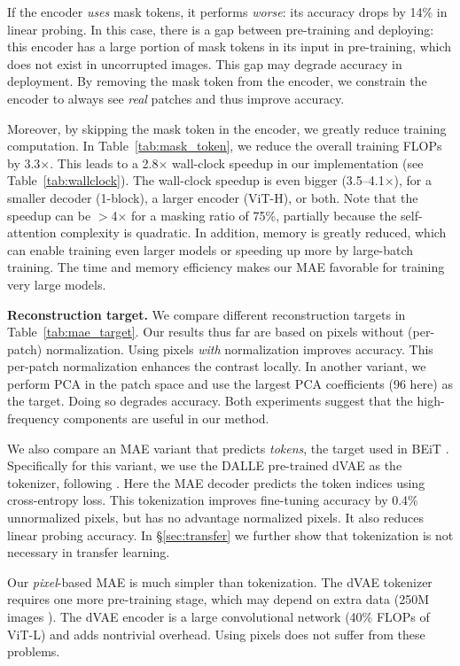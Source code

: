 If the encoder \textit{uses} mask tokens, it performs \textit{worse}: its accuracy drops by 14\% in linear probing. In this case, there is a gap between pre-training and deploying: this encoder has a large portion of mask tokens in its input in pre-training, which does not exist in uncorrupted images. This gap may degrade accuracy in deployment. By removing the mask token from the encoder, we constrain the encoder to always see \textit{real} patches and thus improve accuracy.

Moreover, by skipping the mask token in the encoder, we greatly reduce training computation. In Table~\ref{tab:mask_token}, we reduce the overall training FLOPs by 3.3$\times$. This leads to a 2.8$\times$ wall-clock speedup in our implementation (see Table~\ref{tab:wallclock}). The wall-clock speedup is even bigger (3.5--4.1$\times$), for a smaller decoder (1-block), a larger encoder (\mbox{ViT-H}), or both. Note that the speedup can be $>$4$\times$ for a masking ratio of 75\%, partially because the self-attention complexity is quadratic. In addition, memory is greatly reduced, which can enable training even larger models or speeding up more by large-batch training. The time and memory efficiency makes our MAE favorable for training very large models.

\textbf{Reconstruction target.} We compare different reconstruction targets in Table~\ref{tab:mae_target}. Our results thus far are based on pixels without (per-patch) normalization. Using pixels \textit{with} normalization improves accuracy. This per-patch normalization enhances the contrast locally. In another variant, we perform PCA in the patch space and use the largest PCA coefficients (96 here) as the target. Doing so degrades accuracy. Both experiments suggest that the high-frequency components are useful in our method.

We also compare an MAE variant that predicts \textit{tokens}, the target used in BEiT \cite{Bao2021}. Specifically for this variant, we use the DALLE pre-trained dVAE \cite{Ramesh2021} as the tokenizer, following \cite{Bao2021}. Here the MAE decoder predicts the token indices using cross-entropy loss. This tokenization improves fine-tuning accuracy by 0.4\% \vs unnormalized pixels, but has no advantage \vs normalized pixels. It also reduces linear probing accuracy. In \mbox{\S\ref{sec:transfer}} we further show that tokenization is not necessary in transfer learning.

Our \textit{pixel}-based MAE is much simpler than tokenization. The dVAE tokenizer requires one more pre-training stage, which may depend on extra data (250M images \cite{Ramesh2021}). The dVAE encoder is a large convolutional network (40\% FLOPs of ViT-L) and adds nontrivial overhead. Using pixels does not suffer from these problems.

